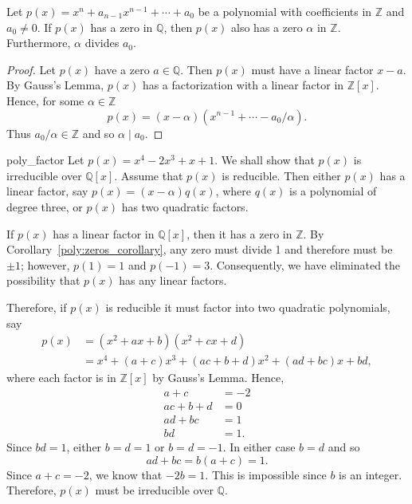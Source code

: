  
\begin{corollary}\label{poly:zeros_corollary}
Let $p(x) = x^n + a_{n-1} x^{n-1} + \cdots + a_0$ be  a polynomial
with coefficients in ${\mathbb Z}$ and $a_0 \neq 0$. If $p(x)$ has a zero
in ${\mathbb Q}$, then $p(x)$ also has a zero $\alpha$ in ${\mathbb Z}$.
Furthermore, $\alpha$ divides $a_0$.  
\end{corollary}
 
 
\begin{proof}
Let $p(x)$ have a zero $a \in {\mathbb Q}$. Then $p(x)$ must have a
linear factor $x-a$.  By Gauss's Lemma, $p(x)$ has a factorization
with a linear factor in ${\mathbb Z}[x]$. Hence, for some $\alpha \in
{\mathbb Z}$ 
\[
p(x) = (x - \alpha)( x^{n-1} + \cdots - a_0 / \alpha ).
\]
Thus $a_0 /\alpha \in {\mathbb Z}$ and so $\alpha \mid a_0$.
\end{proof}
 
 
\begin{example}{poly_factor}
Let $p(x) = x^4 - 2 x^3 + x + 1$. We shall show that $p(x)$ is
irreducible over ${\mathbb Q}[x]$.  Assume that $p(x)$ is reducible. Then
either $p(x)$ has a linear factor, say $p(x) = (x - \alpha) q(x)$,
where $q(x)$ is a polynomial of degree three, or $p(x)$ has two 
quadratic factors. 
 
 
If $p(x)$ has a linear factor in ${\mathbb Q}[x]$, then it has a zero in
${\mathbb Z}$.  By  Corollary~\ref{poly:zeros_corollary}, any zero must divide 1 and therefore
must be $\pm 1$; however, $p(1) = 1$ and $p(-1)= 3$. Consequently, we
have eliminated the possibility that $p(x)$ has any linear factors.   
 
 
Therefore, if $p(x)$ is reducible it must factor into two quadratic 
polynomials, say
\begin{align*}
p(x) & = (x^2 + ax + b )( x^2 + cx + d ) \\
& = x^4 + (a + c)x^3 + (ac + b + d)x^2 + (ad + bc)x + bd,
\end{align*}
where each factor is in ${\mathbb Z}[x]$ by Gauss's Lemma. Hence,
\begin{align*}
a + c & = - 2 \\
ac + b + d & = 0 \\
ad + bc & = 1 \\
bd & = 1.
\end{align*}
Since $bd = 1$, either $b = d = 1$ or $ b = d = -1$. In either case $b
= d$ and so 
\[
ad + bc  = b( a + c ) = 1.
\]
Since $a + c = -2$, we know that $-2b = 1$. This is impossible since
$b$ is an integer. Therefore, $p(x)$ must be irreducible over ${\mathbb
Q}$. 
\end{example}
 

